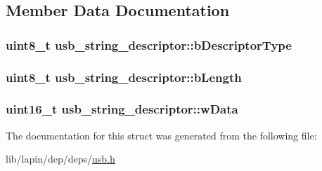 \subsection{Member Data Documentation}
\hypertarget{structusb__string__descriptor_a37d44e07cb6d5b449b03fb70c9677b15}{
\subsubsection[{b\-Descriptor\-Type}]{\setlength{\rightskip}{0pt plus 5cm}uint8\-\_\-t usb\-\_\-string\-\_\-descriptor\-::b\-Descriptor\-Type}}\label{structusb__string__descriptor_a37d44e07cb6d5b449b03fb70c9677b15}
\hypertarget{structusb__string__descriptor_a93d9bb7c2c44f6f0cae1a871a4a18789}{
\subsubsection[{b\-Length}]{\setlength{\rightskip}{0pt plus 5cm}uint8\-\_\-t usb\-\_\-string\-\_\-descriptor\-::b\-Length}}\label{structusb__string__descriptor_a93d9bb7c2c44f6f0cae1a871a4a18789}
\hypertarget{structusb__string__descriptor_a33eb9ec89e16e8097c5baa46f5940859}{
\subsubsection[{w\-Data}]{\setlength{\rightskip}{0pt plus 5cm}uint16\-\_\-t usb\-\_\-string\-\_\-descriptor\-::w\-Data}}\label{structusb__string__descriptor_a33eb9ec89e16e8097c5baa46f5940859}


The documentation for this struct was generated from the following file\-:\begin{DoxyCompactItemize}
\item 
lib/lapin/dep/deps/\hyperlink{deps_2usb_8h}{usb.\-h}\end{DoxyCompactItemize}
